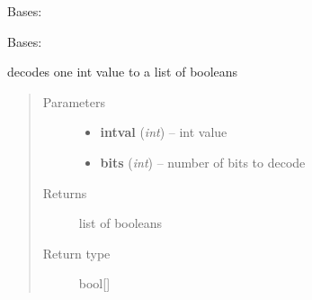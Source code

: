 \documentclass[letterpaper,10pt,english]{sphinxmanual}
\begin{document}

\begin{fulllineitems}
\label{Eurobot:Eurobot.can.MsgSender}
Bases: 

\end{fulllineitems}


\begin{fulllineitems}
\label{Eurobot:Eurobot.can.MsgTypes}
Bases: 

\end{fulllineitems}


\begin{fulllineitems}
\label{Eurobot:Eurobot.can.decode_booleans}
decodes one int value to a list of booleans
\begin{quote}\begin{description}
\item[{Parameters}] \leavevmode\begin{itemize}
\item {} 
\textbf{intval} (\emph{int}) -- int value

\item {} 
\textbf{bits} (\emph{int}) -- number of bits to decode

\end{itemize}

\item[{Returns}] \leavevmode
list of booleans

\item[{Return type}] \leavevmode
bool{[}{]}

\end{description}\end{quote}

\end{fulllineitems}

\end{document}
